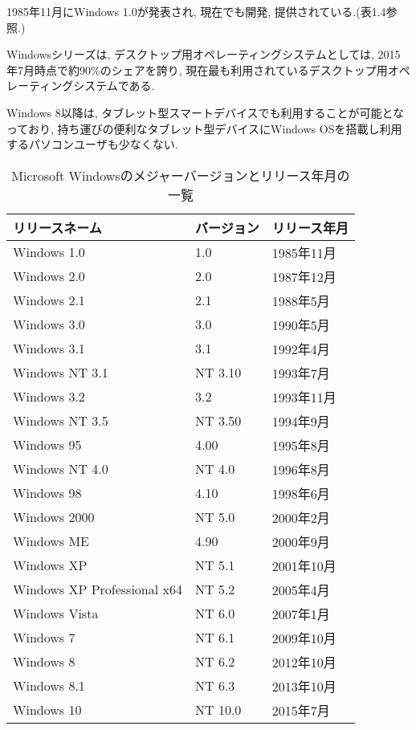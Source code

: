 1985年11月にWindows 1.0が発表され, 現在でも開発, 提供されている.(表1.4参照.)

Windowsシリーズは, デスクトップ用オペレーティングシステムとしては, 2015年7月時点で約90\%のシェアを誇り, 現在最も利用されているデスクトップ用オペレーティングシステムである.

Windows 8以降は, タブレット型スマートデバイスでも利用することが可能となっており, 持ち運びの便利なタブレット型デバイスにWindows OSを搭載し利用するパソコンユーザも少なくない.

\begin{table}[htb]
\begin{center}
\begin{tabular}{|l|l|l|} \hline
リリースネーム & バージョン & リリース年月 \\ \hline \hline
Windows 1.0 & 1.0 & 1985年11月 \\ \hline
Windows 2.0 & 2.0 & 1987年12月 \\ \hline
Windows 2.1 & 2.1 & 1988年5月 \\ \hline
Windows 3.0 & 3.0 & 1990年5月 \\ \hline
Windows 3.1 & 3.1 & 1992年4月 \\ \hline
Windows NT 3.1 & NT 3.10 & 1993年7月 \\ \hline
Windows 3.2 & 3.2 & 1993年11月 \\ \hline
Windows NT 3.5 & NT 3.50 & 1994年9月 \\ \hline
Windows 95 & 4.00 & 1995年8月 \\ \hline
Windows NT 4.0 & NT 4.0 & 1996年8月 \\ \hline
Windows 98 & 4.10 & 1998年6月 \\ \hline
Windows 2000 & NT 5.0 & 2000年2月 \\ \hline
Windows ME & 4.90 & 2000年9月 \\ \hline
Windows XP & NT 5.1 & 2001年10月 \\ \hline
Windows XP Professional x64 & NT 5.2 & 2005年4月 \\ \hline
Windows Vista & NT 6.0 & 2007年1月 \\ \hline
Windows 7 & NT 6.1 & 2009年10月 \\ \hline
Windows 8 & NT 6.2 & 2012年10月 \\ \hline
Windows 8.1 & NT 6.3 & 2013年10月 \\ \hline
Windows 10 & NT 10.0 & 2015年7月 \\ \hline
\end{tabular}
\caption{Microsoft Windowsのメジャーバージョンとリリース年月の一覧}
\end{center}
\end{table}


